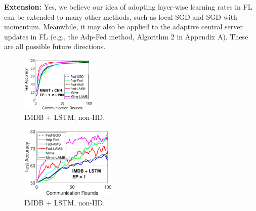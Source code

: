 \documentclass{article}
\begin{document}
\textbf{Extension:} Yes, we believe our idea of adopting layer-wise learning rates in FL can be extended to many other methods, such as local SGD and SGD with momentum. Meanwhile, it may also be applied to the adaptive central server updates in FL (e.g., the Adp-Fed method, Algorithm 2 in Appendix A). These are all possible future directions.

\begin{figure}
  \begin{center}
  \vspace{-0.25in}
    \includegraphics[width=1.4in]{icml_rebuttal_fig/mnist_testerror_cnn_ep1_client200_iid0.eps}
  \end{center}
  \vspace{-0.15in}
  \caption{IMDB + LSTM, non-IID.}
  \label{emp-var}\vspace{-0.1in}
\end{figure}

\begin{figure}
  \begin{center}
  \vspace{-0.25in}
    \includegraphics[width=1.8in]{icml_rebuttal_fig/imdb_testerror_lstm_ep1_client50_iid0.eps}
  \end{center}
  \vspace{-0.15in}
  \caption{IMDB + LSTM, non-IID.}
  \label{emp-var}\vspace{-0.1in}
\end{figure}
\end{document}
